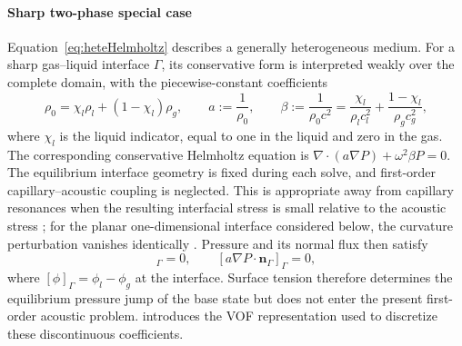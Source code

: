 \documentclass[final,12pt,nopreprintline,longtitle]{elsarticle}
\newcommand{\betaac}{\beta}
\begin{document}
\paragraph{Sharp two-phase special case}
Equation~\eqref{eq:heteHelmholtz} describes a generally heterogeneous medium.
For a sharp gas--liquid interface $\Gamma$, its conservative form is
interpreted weakly over the complete domain, with the piecewise-constant
coefficients
\begin{equation}
    \rho_0=\chi_l\rho_l+(1-\chi_l)\rho_g,
    \qquad
    a:=\frac{1}{\rho_0},
    \qquad
    \betaac:=\frac{1}{\rho_0c^2}
      =\frac{\chi_l}{\rho_lc_l^2}
       +\frac{1-\chi_l}{\rho_gc_g^2},
    \label{eq:sharpTwoPhaseCoefficients}
\end{equation}
where $\chi_l$ is the liquid indicator, equal to one in the liquid and zero in
the gas.  The corresponding conservative Helmholtz equation is
$\nabla\cdot(a\nabla P)+\omega^2\betaac P=0$.  The equilibrium interface
geometry is fixed during each solve, and first-order capillary--acoustic
coupling is neglected.  This is appropriate away from capillary resonances
when the resulting interfacial stress is small relative to the acoustic stress
\cite{Krechetnikov2019,ShapiroWeinstein2011}; for the planar one-dimensional
interface considered below, the curvature perturbation vanishes identically
\cite{Krechetnikov2019}.  Pressure and its normal flux then satisfy
\begin{equation}
    [P]_\Gamma=0,
    \qquad
    [a\nabla P\cdot\mathbf n_\Gamma]_\Gamma=0,
    \label{eq:interfaceJumpConditions}
\end{equation}
where $[\phi]_\Gamma=\phi_l-\phi_g$ at the interface.  Surface tension therefore determines the
equilibrium pressure jump of the base state but does not enter the present
first-order acoustic problem.   introduces
the VOF representation used to discretize these discontinuous coefficients.
\end{document}
